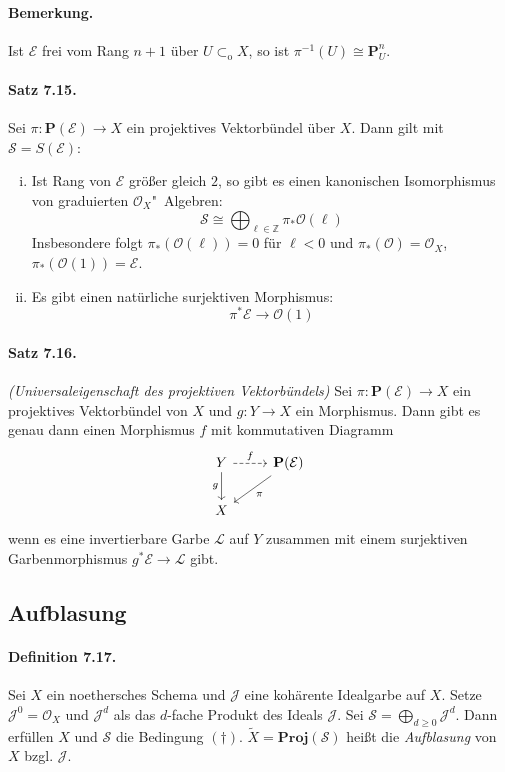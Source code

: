 \paragraph{Bemerkung.} Ist $\mathcal{E}$ frei vom Rang $n+1$ über $U\subset_\text{o}X$, so ist $\pi^{-1}(U)\cong\mathbf{P}_U^n$.

\paragraph{Satz 7.15.}\label{7.15} Sei $\pi:\mathbf{P}(\mathcal{E})\to X$ ein projektives Vektorbündel über $X$. Dann gilt mit $\mathcal{S}=S(\mathcal{E})$:
\begin{enumerate}[(i)]
\item Ist Rang von $\mathcal{E}$ größer gleich $2$, so gibt es einen kanonischen Isomorphismus von graduierten $\mathcal{O}_X$"~Algebren:
\[\mathcal{S}\cong\bigoplus_{\ell\in\mathbb{Z}}\pi_\ast\mathcal{O}(\ell)\]
Insbesondere folgt $\pi_\ast(\mathcal{O}(\ell))=0$ für $\ell<0$ und $\pi_\ast(\mathcal{O})=\mathcal{O}_X$, $\pi_\ast(\mathcal{O}(1))=\mathcal{E}$.
\item Es gibt einen natürliche surjektiven Morphismus:
\[\pi^\ast\mathcal{E}\to\mathcal{O}(1) \]
\end{enumerate}

\paragraph{Satz 7.16.}\label{7.16} \textit{(Universaleigenschaft des projektiven Vektorbündels)} Sei $\pi:\mathbf{P}(\mathcal{E})\to X$ ein projektives Vektorbündel von $X$ und $g:Y\to X$ ein Morphismus. Dann gibt es genau dann einen Morphismus $f$ mit kommutativen Diagramm
\[\begin{tikzcd}
Y\rar[dashed, "f"]\dar["g"'] &\mathbf{P}(\mathcal{E})\ar[dl, "\pi"]\\
X&
\end{tikzcd}\]
wenn es eine invertierbare Garbe $\mathcal{L}$ auf $Y$ zusammen mit einem surjektiven Garbenmorphismus $g^\ast\mathcal{E}\to\mathcal{L}$ gibt.

\subsection{Aufblasung}

\paragraph{Definition 7.17.}\label{7.17} Sei $X$ ein noethersches Schema und $\mathcal{J}$ eine kohärente Idealgarbe auf $X$. Setze $\mathcal{J}^0=\mathcal{O}_X$ und $\mathcal{J}^d$ als das $d$-fache Produkt des Ideals $\mathcal{J}$. Sei $\mathcal{S}=\bigoplus_{d\geq 0}\mathcal{J}^d$. Dann erfüllen $X$ und $\mathcal{S}$ die Bedingung $(\dagger)$. $\widetilde{X}=\mathbf{Proj}(\mathcal{S})$ heißt die \textit{Aufblasung} von $X$ bzgl. $\mathcal{J}$.

